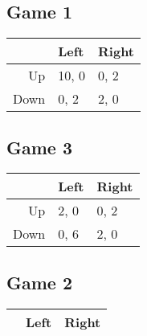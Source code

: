 \begin{multicols}{2}
\subsection*{Game 1}
\label{game1}

\begin{minipage}{\linewidth}
\setlength{\tymax}{0.5\linewidth}
\centering
\small
\begin{tabulary}{\textwidth}{@{}rll@{}} \toprule
 & Left & Right \\
\midrule

 Up & 10, 0 & 0, 2 \\
 Down & 0, 2 & 2, 0 \\
\bottomrule

\end{tabulary}
\end{minipage}

\subsection*{Game 3}
\label{game2}

\begin{minipage}{\linewidth}
\setlength{\tymax}{0.5\linewidth}
\centering
\small
\begin{tabulary}{\textwidth}{@{}rll@{}} \toprule
 & Left & Right \\
\midrule

 Up & 2, 0 & 0, 2 \\
 Down & 0, 6 & 2, 0 \\
\bottomrule

\end{tabulary}
\end{minipage}


\subsection*{Game 2}
\label{game3}

\begin{minipage}{\linewidth}
\setlength{\tymax}{0.5\linewidth}
\centering
\small
\begin{tabulary}{\textwidth}{@{}rll@{}} \toprule
 & Left & Right \\
\midrule


\end{tabulary}
\end{minipage}
\end{multicols}

